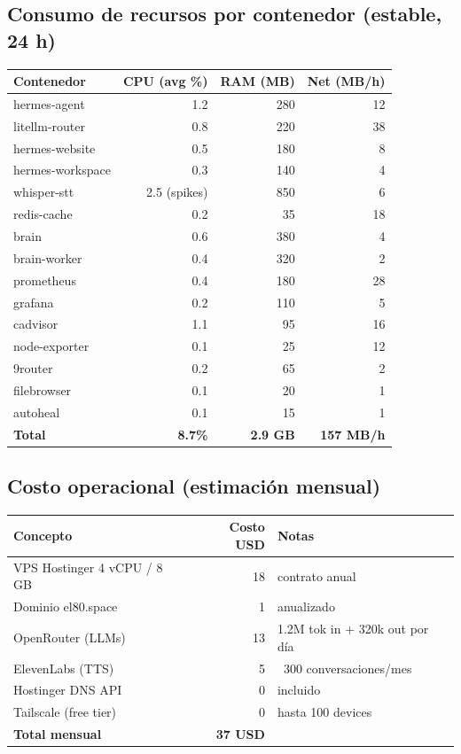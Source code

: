 \documentclass[11pt,a4paper]{article}
\begin{document}
\subsection{Consumo de recursos por contenedor (estable, 24 h)}

\begin{center}
\begin{longtable}{|l|r|r|r|}
\hline
\rowcolor{sotared}\color{white}\textbf{Contenedor} & \color{white}\textbf{CPU (avg \%)} & \color{white}\textbf{RAM (MB)} & \color{white}\textbf{Net (MB/h)}\\
\hline
\endhead
hermes-agent & 1.2 & 280 & 12\\
litellm-router & 0.8 & 220 & 38\\
hermes-website & 0.5 & 180 & 8\\
hermes-workspace & 0.3 & 140 & 4\\
whisper-stt & 2.5 (spikes) & 850 & 6\\
redis-cache & 0.2 & 35 & 18\\
brain & 0.6 & 380 & 4\\
brain-worker & 0.4 & 320 & 2\\
prometheus & 0.4 & 180 & 28\\
grafana & 0.2 & 110 & 5\\
cadvisor & 1.1 & 95 & 16\\
node-exporter & 0.1 & 25 & 12\\
9router & 0.2 & 65 & 2\\
filebrowser & 0.1 & 20 & 1\\
autoheal & 0.1 & 15 & 1\\
\hline
\rowcolor{okbg}\textbf{Total} & \textbf{~8.7\%} & \textbf{~2.9 GB} & \textbf{~157 MB/h}\\
\hline
\end{longtable}
\end{center}

\subsection{Costo operacional (estimación mensual)}

\begin{center}
\begin{tabular}{|l|r|l|}
\hline
\rowcolor{sotared}\color{white}\textbf{Concepto} & \color{white}\textbf{Costo USD} & \color{white}\textbf{Notas}\\
\hline
VPS Hostinger 4 vCPU / 8 GB & 18 & contrato anual\\
Dominio el80.space & 1 & anualizado\\
OpenRouter (LLMs) & ~13 & 1.2M tok in + 320k out por día\\
ElevenLabs (TTS) & ~5 & ~300 conversaciones/mes\\
Hostinger DNS API & 0 & incluido\\
Tailscale (free tier) & 0 & hasta 100 devices\\
\hline
\rowcolor{okbg}\textbf{Total mensual} & \textbf{~37 USD} & \\
\hline
\end{tabular}
\end{center}
\end{document}
